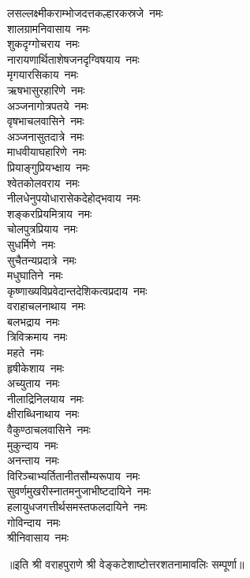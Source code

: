 \begin{multicols}{2}
\begin{flushleft}
लसल्लक्ष्मीकराम्भोजदत्त\-कल्हारकस्रजे~नमः\\
शालग्रामनिवासाय~नमः\\
शुकदृग्गोचराय~नमः\\
नारायणार्थिताशेषजन\-दृग्विषयाय~नमः\\
मृगयारसिकाय~नमः\\
ऋषभासुरहारिणे~नमः\hfill{}\\
अञ्जनागोत्रपतये~नमः\\
वृषभाचलवासिने~नमः\\
अञ्जनासुतदात्रे~नमः\\
माधवीयाघहारिणे~नमः\\
प्रियाङ्गुप्रियभ्क्षाय~नमः\\
श्वेतकोलवराय~नमः\\
नीलधेनुपयोधारासेक\-देहोद्भवाय~नमः\\
शङ्करप्रियमित्राय~नमः\\
चोलपुत्रप्रियाय~नमः\\
सुधर्मिणे~नमः\hfill{}\\
सुचैतन्यप्रदात्रे~नमः\\
मधुघातिने~नमः\\
कृष्णाख्यविप्रवेदान्त\-देशिकत्व\-प्रदाय~नमः\\
वराहाचलनाथाय~नमः\\
बलभद्राय~नमः\\
त्रिविक्रमाय~नमः\\
महते~नमः\\
हृषीकेशाय~नमः\\
अच्युताय~नमः\\
नीलाद्रिनिलयाय~नमः\hfill{}\\
क्षीराब्धिनाथाय~नमः\\
वैकुण्ठाचलवासिने~नमः\\
मुकुन्दाय~नमः\\
अनन्ताय~नमः\\
विरिञ्चाभ्यर्तितानीत\-सौम्य\-रूपाय~नमः\\
सुवर्णमुखरीस्नातमनुजाभीष्ट\-दायिने~नमः\\
हलायुधजगत्तीर्थसमस्त\-फलदायिने~नमः\\
गोविन्दाय~नमः\\
श्रीनिवासाय~नमः\\
\end{flushleft}
\end{multicols}
॥इति श्री वराहपुराणे श्री वेङ्कटेशाष्टोत्तरशतनामावलिः सम्पूर्णा॥
